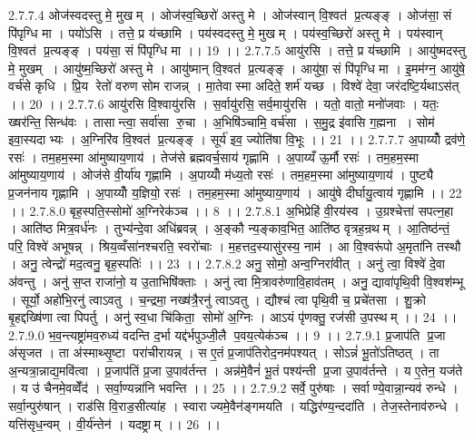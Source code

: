 2.7.7.4
ओज॑स्वदस्तु मे॒ मुखम् । ओज॑स्व॒च्छिरो॑ अस्तु मे । ओज॑स्वान् वि॒श्वत॑ प्र॒त्यङ्ङ् । ओज॑सा॒ सं पि॑पृग्धि मा । पयो॑ऽसि । तत्ते॒ प्र य॑च्छामि । पय॑स्वदस्तु मे॒ मुखम् । पय॑स्व॒च्छिरो॑ अस्तु मे । पय॑स्वान् वि॒श्वत॑ प्र॒त्यङ्ङ् । पय॑सा॒ सं पि॑पृग्धि मा ।। 19 ।।
2.7.7.5
आयु॑रसि । तत्ते॒ प्र य॑च्छामि । आयु॑ष्मदस्तु मे॒ मुखम् । आयु॑ष्म॒च्छिरो॑ अस्तु मे । आयु॑ष्मान् वि॒श्वत॑ प्र॒त्यङ्ङ् । आयु॑षा॒ सं पि॑पृग्धि मा । इ॒मम॑ग्न॒ आयु॑षे॒ वर्च॑से कृधि । प्रि॒य रेतो॑ वरुण सोम राजन्न् । मा॒तेवास्मा अदिते॒ शर्म॑ यच्छ । विश्वे॑ देवा॒ जर॑दष्टि॒र्यथाऽस॑त् ।। 20 ।।
2.7.7.6
आयु॑रसि वि॒श्वायु॑रसि । स॒र्वायु॑रसि॒ सर्व॒मायु॑रसि । यतो॒ वातो॒ मनो॑जवाः । यतः॒ ख्षर॑न्ति॒ सिन्ध॑वः । तासान्त्वा॒ सर्वा॑सा रु॒चा । अ॒भिषि॑ञ्चामि॒ वर्च॑सा । स॒मु॒द्र इ॑वासि ग॒ह्मना । सोम॑ इवा॒स्यदाभ्यः । अ॒ग्निरि॑व वि॒श्वत॑ प्र॒त्यङ्ङ् । सूर्य॑ इव॒ ज्योति॑षा वि॒भूः ।। 21 ।।
2.7.7.7
अ॒पाय्योँ द्रव॑णे॒ रसः॑ । तम॒हम॒स्मा आ॑मुष्याय॒णाय॑ । तेज॑से ब्रह्मवर्च॒साय॑ गृह्णामि । अ॒पाय्यँ ऊ॒र्मौ रसः॑ । तम॒हम॒स्मा आ॑मुष्याय॒णाय॑ । ओज॑से वी॒र्या॑य गृह्णामि । अ॒पाय्योँ म॑ध्य॒तो रसः॑ । तम॒हम॒स्मा आ॑मुष्याय॒णाय॑ । पुष्ट्यै प्र॒जन॑नाय गृह्णामि । अ॒पाय्योँ य॒ज्ञियो॒ रसः॑ । तम॒हम॒स्मा आ॑मुष्याय॒णाय॑ । आयु॑षे दीर्घायु॒त्वाय॑ गृह्णामि ।। 22 ।।
2.7.8.0
बृह॒स्पति॒स्सोमो॑ अ॒ग्निरेक॑ञ्च ।। 8 ।।
2.7.8.1
अ॒भिप्रेहि॑ वी॒रय॑स्व । उ॒ग्रश्चेत्ता॑ सपत्न॒हा । आति॑ष्ठ मित्र॒वर्ध॑नः । तुभ्य॑न्दे॒वा अधि॑ब्रवन्न् । अ॒ङ्कौ न्य॒ङ्काव॒भित॒ आति॑ष्ठ वृत्रह॒न्रथम् । आ॒तिष्ठ॑न्तं॒ परि॒ विश्वे॑ अभूषन्न् । श्रिय॒व्वँसा॑नश्चरति॒ स्वरो॑चाः । म॒हत्तद॒स्यासु॑रस्य॒ नाम॑ । आ वि॒श्वरू॑पो अ॒मृता॑नि तस्थौ । अनु॒ त्वेन्द्रो॑ मद॒त्वनु॒ बृह॒स्पतिः॑ ।। 23 ।।
2.7.8.2
अनु॒ सोमो॒ अन्व॒ग्निरा॑वीत् । अनु॑ त्वा॒ विश्वे॑ दे॒वा अ॑वन्तु । अनु॑ स॒प्त राजा॑नो॒ य उ॒ताभिषि॑क्ताः । अनु॑ त्वा मि॒त्रावरु॑णावि॒हाव॑तम् । अनु॒ द्यावा॑पृथि॒वी वि॒श्वश॑म्भू । सूर्यो॒ अहो॑भि॒रनु॑ त्वाऽवतु । च॒न्द्रमा॒ नख्ष॑त्रै॒रनु॑ त्वाऽवतु । द्यौश्च॑ त्वा पृथि॒वी च॒ प्रचे॑तसा । शु॒क्रो बृ॒हद्दख्षि॑णा त्वा पिपर्तु । अनु॑ स्व॒धा चि॑किता॒॒ सोमो॑ अ॒ग्निः । आऽयं पृ॑णक्तु॒ रज॑सी उ॒पस्थम् ।। 24 ।।
2.7.9.0
भ॒व॒न्त्यष्ट्रा॑मव॒रुध्य॑ वदन्ति द॒र्भा यद्द॑र्भपुञ्जी॒लै प॒वय॒त्येक॑ञ्च ।। 9 ।।
2.7.9.1
प्र॒जाप॑ति प्र॒जा अ॑सृजत । ता अ॑स्माथ्सृ॒ष्टा परा॑चीरायन्न् । स ए॒तं प्र॒जाप॑तिरोद॒नम॑पश्यत् । सोऽन्नं॑ भू॒तो॑ऽतिष्ठत् । ता अ॒न्यत्रा॒न्नाद्य॒मवि॑त्वा । प्र॒जाप॑तिं प्र॒जा उ॒पाव॑र्तन्त । अन्न॑मे॒वैनं॑ भू॒तं पश्य॑न्ती प्र॒जा उ॒पाव॑र्तन्ते । य ए॒तेन॒ यज॑ते । य उ॑ चैनमे॒वव्वेँद॑ । सर्वा॒ण्यन्ना॑नि भवन्ति ।। 25 ।।
2.7.9.2
सर्वे॒ पुरु॑षाः । सर्वाण्ये॒वान्ना॒न्यव॑ रुन्धे । सर्वा॒न्पुरु॑षान् । राड॑सि वि॒राड॒सीत्या॑ह । स्वाराज्यमे॒वैन॑ङ्गमयति । यद्धिर॑ण्य॒न्ददा॑ति । तेज॒स्तेनाव॑रुन्धे । यत्ति॑सृध॒न्वम् । वी॒र्य॑न्तेन॑ । यदष्ट्राम् ।। 26 ।।
